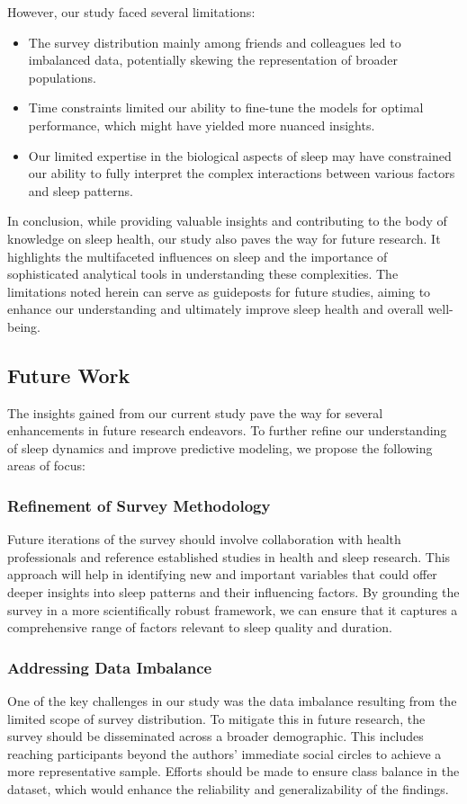 \documentclass[conference]{IEEEtran}
\begin{document}
However, our study faced several limitations:
\begin{itemize}
    \item The survey distribution mainly among friends and colleagues led to imbalanced data, potentially skewing the representation of broader populations.
    \item Time constraints limited our ability to fine-tune the models for optimal performance, which might have yielded more nuanced insights.
    \item Our limited expertise in the biological aspects of sleep may have constrained our ability to fully interpret the complex interactions between various factors and sleep patterns.
\end{itemize}

In conclusion, while providing valuable insights and contributing to the body of knowledge on sleep health, our study also paves the way for future research. It highlights the multifaceted influences on sleep and the importance of sophisticated analytical tools in understanding these complexities. The limitations noted herein can serve as guideposts for future studies, aiming to enhance our understanding and ultimately improve sleep health and overall well-being.


\subsection*{Future Work}

The insights gained from our current study pave the way for several enhancements in future research endeavors. To further refine our understanding of sleep dynamics and improve predictive modeling, we propose the following areas of focus:

\subsubsection*{Refinement of Survey Methodology}
Future iterations of the survey should involve collaboration with health professionals and reference established studies in health and sleep research. This approach will help in identifying new and important variables that could offer deeper insights into sleep patterns and their influencing factors. By grounding the survey in a more scientifically robust framework, we can ensure that it captures a comprehensive range of factors relevant to sleep quality and duration.

\subsubsection*{Addressing Data Imbalance}
One of the key challenges in our study was the data imbalance resulting from the limited scope of survey distribution. To mitigate this in future research, the survey should be disseminated across a broader demographic. This includes reaching participants beyond the authors' immediate social circles to achieve a more representative sample. Efforts should be made to ensure class balance in the dataset, which would enhance the reliability and generalizability of the findings.
\end{document}
